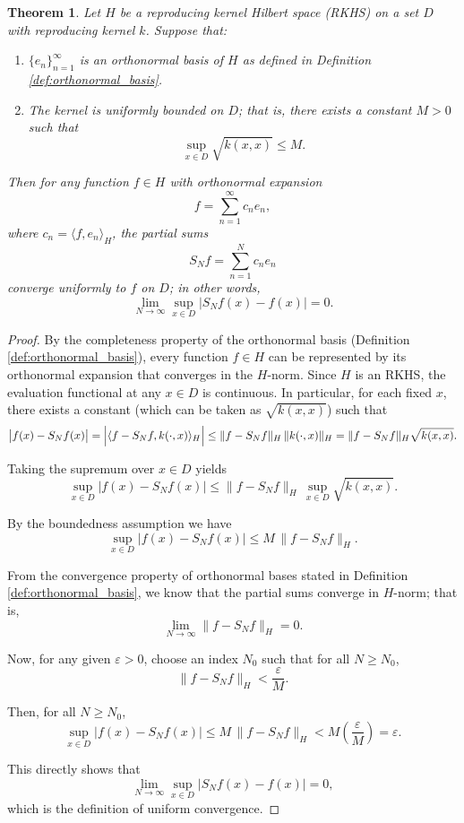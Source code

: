 \documentclass{article}
\newtheorem{theorem}{Theorem}
\theoremstyle{definition}
\begin{document}
\begin{theorem}
\label{thm:uniform_convergence}
Let $H$ be a reproducing kernel Hilbert space (RKHS) on a set $D$ with reproducing kernel $k$. Suppose that:
\begin{enumerate}
    \item $\{e_n\}_{n=1}^{\infty}$ is an orthonormal basis of $H$ as defined in Definition \ref{def:orthonormal_basis}.
    \item The kernel is uniformly bounded on $D$; that is, there exists a constant $M > 0$ such that
    \[
    \sup_{x \in D} \sqrt{k(x, x)} \le M.
    \]
\end{enumerate}
Then for any function $f \in H$ with orthonormal expansion
\[
f = \sum_{n=1}^{\infty} c_n e_n,
\]
where $c_n = \langle f, e_n \rangle_H$, the partial sums
\[
S_N f = \sum_{n=1}^N c_n e_n
\]
converge uniformly to $f$ on $D$; in other words,
\[
\lim_{N\to\infty} \sup_{x\in D} \bigl| S_N f(x) - f(x) \bigr| = 0.
\]
\end{theorem}

\begin{proof}
By the completeness property of the orthonormal basis (Definition \ref{def:orthonormal_basis}), every function $f \in H$ can be represented by its orthonormal expansion that converges in the $H$-norm. Since $H$ is an RKHS, the evaluation functional at any $x \in D$ is continuous. In particular, for each fixed $x$, there exists a constant (which can be taken as $\sqrt{k(x,x)}$) such that
\[
\bigl| f(x) - S_N f(x) \bigr| = \Bigl| \langle f - S_N f, k(\cdot, x) \rangle_H \Bigr| \le \|f - S_N f\|_H \, \|k(\cdot, x)\|_H = \|f - S_N f\|_H \sqrt{k(x, x)}.
\]

Taking the supremum over $x \in D$ yields
\[
\sup_{x \in D} \bigl| f(x) - S_N f(x) \bigr| \le \|f - S_N f\|_H \, \sup_{x \in D} \sqrt{k(x, x)}.
\]

By the boundedness assumption we have
\[
\sup_{x \in D} \bigl| f(x) - S_N f(x) \bigr| \le M \, \|f - S_N f\|_H.
\]

From the convergence property of orthonormal bases stated in Definition \ref{def:orthonormal_basis}, we know that the partial sums converge in $H$-norm; that is,
\[
\lim_{N\to\infty} \|f - S_N f\|_H = 0.
\]

Now, for any given $\varepsilon > 0$, choose an index $N_0$ such that for all $N \ge N_0$,
\[
\|f - S_N f\|_H < \frac{\varepsilon}{M}.
\]

Then, for all $N \ge N_0$,
\[
\sup_{x \in D} \bigl| f(x) - S_N f(x) \bigr| \le M \, \|f - S_N f\|_H < M \left( \frac{\varepsilon}{M} \right) = \varepsilon.
\]

This directly shows that
\[
\lim_{N\to\infty} \sup_{x\in D} |S_N f(x) - f(x)| = 0,
\]
which is the definition of uniform convergence.
\end{proof}
\end{document}
